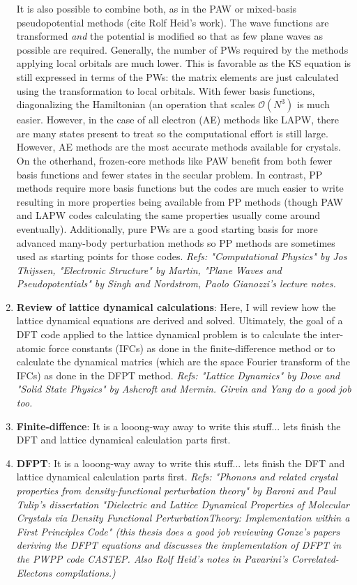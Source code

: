 \documentclass[prb,aps,11pt,superscriptaddress,floatfix]{revtex4-2}
\begin{document}
\begin{enumerate}
\begin{enumerate}
    \end{enumerate}
    It is also possible to combine both, as in the PAW or mixed-basis pseudopotential methods (cite Rolf Heid's work). The wave functions are transformed \emph{and} the potential is modified so that as few plane waves as possible are required. Generally, the number of PWs required by the methods applying local orbitals are much lower. This is favorable as the KS equation is still expressed in terms of the PWs: the matrix elements are just calculated using the transformation to local orbitals. With fewer basis functions, diagonalizing the Hamiltonian (an operation that scales $\mathcal{O}(N^3)$ is much easier. However, in the case of all electron (AE) methods like LAPW, there are many states present to treat so the computational effort is still large. However, AE methods are the most accurate methods available for crystals. On the otherhand, frozen-core methods like PAW benefit from both fewer basis functions and fewer states in the secular problem. In contrast, PP methods require more basis functions but the codes are much easier to write resulting in more properties being available from PP methods (though PAW and LAPW codes calculating the same properties usually come around eventually). Additionally, pure PWs are a good starting basis for more advanced many-body perturbation methods so PP methods are sometimes used as starting points for those codes. \emph{Refs: "Computational Physics" by Jos Thijssen, "Electronic Structure" by Martin, "Plane Waves and Pseudopotentials" by Singh and Nordstrom, Paolo Gianozzi's lecture notes.}
  \item \textbf{Review of lattice dynamical calculations}: Here, I will review how the lattice dynamical equations are derived and solved. Ultimately, the goal of a DFT code applied to the lattice dynamical problem is to calculate the inter-atomic force constants (IFCs) as done in the finite-difference method or to calculate the dynamical matrics (which are the space Fourier transform of the IFCs) as done in the DFPT method. \emph{Refs: "Lattice Dynamics" by Dove and "Solid State Physics" by Ashcroft and Mermin. Girvin and Yang do a good job too.}
  \item \textbf{Finite-diffence}: It is a looong-way away to write this stuff... lets finish the DFT and lattice dynamical calculation parts first. 
  \item \textbf{DFPT}: It is a looong-way away to write this stuff... lets finish the DFT and lattice dynamical calculation parts first. \emph{Refs: "Phonons and related crystal properties from density-functional perturbation theory" by Baroni and Paul Tulip's dissertation "Dielectric and Lattice Dynamical Properties of Molecular Crystals via Density Functional PerturbationTheory: Implementation within a First Principles Code" (this thesis does a good job reviewing Gonze's papers deriving the DFPT equations and discusses the implementation of DFPT in the PWPP code \textsc{CASTEP}. Also Rolf Heid's notes in Pavarini's Correlated-Electons compilations.)}

\end{enumerate}
\end{document}
